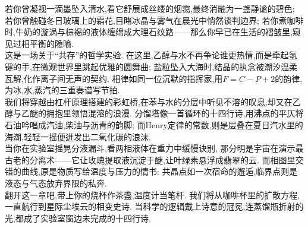 \documentclass{ctexart}
\begin{document}
\pagestyle{plain}
\setcounter{footnote}{0}
\begin{center}
\end{center}\vspace{15pt}

\indent 若你曾凝视一滴墨坠入清水,看它舒展成丝缕的烟霭,最终消融为一盏静谧的碧色;%
若你曾触碰冬日玻璃上的霜花,目睹冰晶与雾气在晨光中悄然谈判边界;%
若你煮咖啡时,牛奶的漩涡与棕褐的液体缠绵成大理石纹路——那么你早已在生活的褶皱里,窥见过相平衡的隐喻.\\
\indent 这是一场关于“共存”的哲学实验.%
在这里,乙醇与水不再争论谁更热情,而是牵起氢键的手,在微观世界里跳起优雅的圆舞曲;%
盐粒坠入大海时,结晶的执念被潮汐温柔瓦解,化作离子间无声的契约.%
相律如同一位沉默的指挥家,用$F=C-P+2$的韵律,为冰,水,蒸汽的三重奏谱写节拍.\\
\indent 我们将穿越由杠杆原理搭建的彩虹桥,在苯与水的分层中听见不溶的叹息,却又在乙醇与乙醚的拥抱里领悟混溶的浪漫.%
分馏塔像一首循环的十四行诗,用沸点的平仄将石油吟唱成汽油,柴油与沥青的韵脚;%
而Henry定律的常数,则是层叠在夏日汽水里的海潮,轻轻一摇便迸发出二氧化碳的浪沫.\\
\indent 当你在实验室摇晃分液漏斗,看两相液体在重力中缓慢诀别,%
那分明是宇宙在演示最古老的分离术——它让玫瑰提取液沉淀于醚,让叶绿素悬浮成翡翠的云.%
而相图里交错的曲线,原是物质写给温度与压力的情书:%
共晶点如一次宿命的邂逅,临界点则是液态与气态放弃界限的私奔.\\
\indent 翻开这一章吧,带上你的烧杯作茶盏,温度计当笔杆.%
我们将从咖啡杯里的扩散方程,一直航行到星际尘埃云的相变史诗.%
当科学的逻辑戴上诗意的冠冕,连蒸馏瓶折射的光,都成了实验室窗边未完成的十四行诗.
\end{document}
